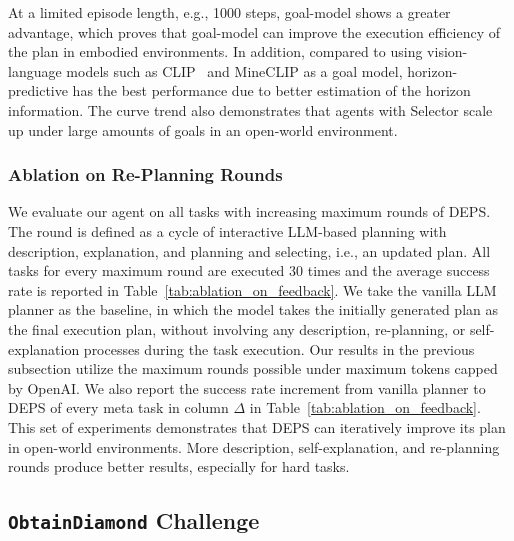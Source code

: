 \documentclass{article}
\begin{document}
At a limited episode length, e.g., 1000 steps, goal-model shows a greater advantage, which proves that goal-model can improve the execution efficiency of the plan in embodied environments.
In addition, compared to using vision-language models such as CLIP\ \cite{clip} and MineCLIP \cite{minedojo} as a goal model, horizon-predictive has the best performance due to better estimation of the horizon information.
The curve trend also demonstrates that agents with Selector scale up under large amounts of goals in an open-world environment.




\subsubsection{Ablation on Re-Planning Rounds}
We evaluate our agent on all tasks with increasing maximum rounds of DEPS. 
The round is defined as a cycle of interactive LLM-based planning with description, explanation, and planning and selecting, i.e., an updated plan.
All tasks for every maximum round are executed 30 times and the average success rate is reported in Table~\ref{tab:ablation_on_feedback}.
We take the vanilla LLM planner as the baseline, in which the model takes the initially generated plan as the final execution plan, without involving any description, re-planning, or self-explanation processes during the task execution.
Our results in the previous subsection utilize the maximum rounds possible under maximum tokens capped by OpenAI.
We also report the success rate increment from vanilla planner to DEPS of every meta task in column $\Delta$ in Table~\ref{tab:ablation_on_feedback}.
This set of experiments demonstrates that DEPS can iteratively improve its plan in open-world environments. More description, self-explanation, and re-planning rounds produce better results, especially for hard tasks.

% 


\subsection{\texttt{ObtainDiamond} Challenge}\label{sec:bonus}
\end{document}
